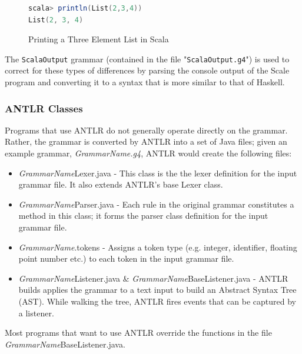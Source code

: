 \documentclass{report}
\begin{document}
\begin{figure}[H]
\begin{mdframed}
\begin{lstlisting}[language=Scala]
scala> println(List(2,3,4))
List(2, 3, 4)
\end{lstlisting}
\end{mdframed}
\caption{Printing a Three Element List in Scala}\label{fig:printListScala}
\end{figure}

The \texttt{ScalaOutput} grammar (contained in the file "\texttt{ScalaOutput.g4}") is used to correct for these types of differences by parsing the console output of the Scale program and converting it to a syntax that is more similar to that of Haskell.

\subsubsection{ANTLR Classes}

Programs that use ANTLR do not generally operate directly on the grammar.  Rather, the grammar is converted by ANTLR into a set of Java files; given an example grammar, \emph{GrammarName.g4},  ANTLR would create the following files:

\begin{itemize}
	\item \emph{GrammarName}Lexer.java - This class is the the lexer definition for the input grammar file.  It also extends ANTLR's base Lexer class.
	
	\item \emph{GrammarName}Parser.java - Each rule in the original grammar constitutes a method in this class; it forms the parser class definition for the input grammar file.
	
	\item \emph{GrammarName}.tokens - Assigns a token type (e.g. integer, identifier, floating point number etc.) to each token in the input grammar file.
	
	\item \emph{GrammarName}Listener.java \& \emph{GrammarName}BaseListener.java - ANTLR builds applies the grammar to a text input to build an Abstract Syntax Tree (AST).  While walking the tree, ANTLR fires events that can be captured by a listener\cite{antlrDefinitiveReference}.
\end{itemize}

Most programs that want to use ANTLR override the functions in the file \emph{GrammarName}BaseListener.java.
\end{document}
